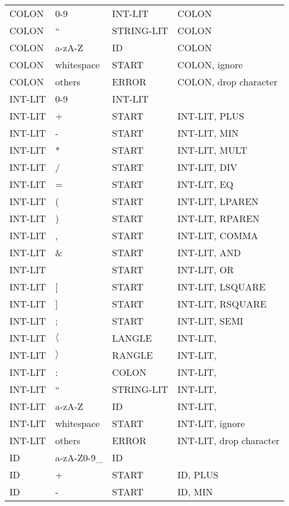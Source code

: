 \documentclass[11pt, fleqn]{article}
\begin{document}
\begin{longtable}{l|l|l|l}
COLON			&	0-9								&	INT-LIT			&	COLON					\\
COLON			&	``								&	STRING-LIT		&	COLON					\\
COLON			&	a-zA-Z							&	ID				&	COLON					\\
COLON			&	whitespace						&	START			&	COLON, ignore				\\
COLON			&	others							&	ERROR			&	COLON, drop character		\\
INT-LIT			&	0-9								&	INT-LIT			&						\\
INT-LIT			&	+								&	START			&	INT-LIT, PLUS		\\
INT-LIT			&	-								&	START			&	INT-LIT, MIN				\\
INT-LIT			&	*								&	START			&	INT-LIT, MULT			\\
INT-LIT			&	/								&	START			&	INT-LIT, DIV			\\
INT-LIT			&	=								&	START			&	INT-LIT, EQ			\\
INT-LIT			&	(								&	START			&	INT-LIT, LPAREN		\\
INT-LIT			&	)								&	START			&	INT-LIT, RPAREN		\\
INT-LIT			&	,								&	START			&	INT-LIT, COMMA		\\
INT-LIT			&	\&								&	START			&	INT-LIT, AND			\\
INT-LIT			&	\textbar							&	START			&	INT-LIT, OR			\\
INT-LIT			&	[								&	START			&	INT-LIT, LSQUARE		\\
INT-LIT			&	]								&	START			&	INT-LIT, RSQUARE		\\
INT-LIT			&	;								&	START			&	INT-LIT, SEMI				\\
INT-LIT			&	$\langle$						&	LANGLE			&	INT-LIT, 					\\
INT-LIT			&	$\rangle$						&	RANGLE			&	INT-LIT, 					\\
INT-LIT			&	:								&	COLON			&	INT-LIT, 					\\
INT-LIT			&	``								&	STRING-LIT		&	INT-LIT, 					\\
INT-LIT			&	a-zA-Z							&	ID				&	INT-LIT, 					\\
INT-LIT			&	whitespace						&	START			&	INT-LIT, ignore		\\
INT-LIT			&	others							&	ERROR			&	INT-LIT, 	drop character	\\
ID			&	a-zA-Z0-9\_						&	ID				&						\\
ID			&	+								&	START			&	ID, PLUS					\\
ID			&	-								&	START			&	ID, MIN					\\

\end{longtable}
\end{document}

